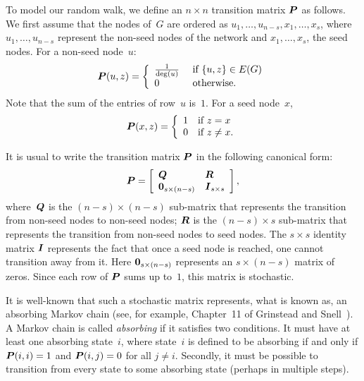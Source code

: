 To model our random walk, we define an $n \times n$ transition matrix $\boldsymbol{P}$ 
as follows. We first assume that the nodes of~$G$ are ordered as 
$u_1, \ldots, u_{n - s}, x_{1}, \ldots, x_{s}$, where $u_1, \ldots, u_{n - s}$
represent the non-seed nodes of the network and $x_1, \ldots, x_s$, the seed nodes.
For a non-seed node~$u$:
\begin{equation}\label{eqn:defining_prob_nonseed}
	\boldsymbol{P}(u, z) = \left \{ 
							\begin{array}{ll}
								\frac{1}{\deg (u)} & \mbox{ if } \{u, z\} \in E(G) \\
								0			& \mbox{ otherwise.}
							\end{array}
						\right.
\end{equation}
Note that the sum of the entries of row~$u$ is~$1$. 
For a seed node~$x$, 
\begin{equation}\label{eqn:defining_prob_seed}
	\boldsymbol{P}(x,z) = 	\left \{ 
						\begin{array}{ll}
							1 & \mbox{if $z = x$} \\
							0 & \mbox{if $z \neq x$.}
						\end{array}
					\right.
\end{equation}

It is usual to write the transition matrix $\boldsymbol{P}$ in the following canonical form:
\begin{equation}\label{eqn:canonical_form_P}
	\boldsymbol{P} = 	\left [ \begin{array}{ll}
						\boldsymbol{Q}  & \boldsymbol{R} \\
						 \boldsymbol{0}_{s \times (n - s)} & \boldsymbol{I}_{s \times s}
						\end{array}
				\right ],
\end{equation}
where~$\boldsymbol{Q}$ is the $(n - s) \times (n - s)$ sub-matrix that represents the transition 
from non-seed nodes to non-seed nodes; $\boldsymbol{R}$ is the $(n - s) \times s$ sub-matrix 
that represents the transition from non-seed nodes to seed nodes. The $s \times s$ identity 
matrix $\boldsymbol{I}$ represents the fact that once a seed node is reached, one cannot transition away 
from it. Here $\boldsymbol{0}_{s \times (n - s)}$ represents an $s \times (n - s)$ matrix of zeros. 
Since each row of $\boldsymbol{P}$ sums up to~$1$, this matrix is stochastic.

It is well-known that such a stochastic matrix represents, what is known as, an 
absorbing Markov chain (see, for example, Chapter~11 of Grinstead and Snell~\cite{GS98}).  
A Markov chain is called \emph{absorbing} if it satisfies two conditions. 
It must have at least one absorbing state~$i$, where state~$i$ is defined 
to be absorbing if and only if $\boldsymbol{P}(i,i) = 1$ and $\boldsymbol{P}(i, j) = 0$ 
for all $j \neq i$. Secondly, it must be possible to transition from every state to 
    some absorbing state (perhaps in multiple steps). 

